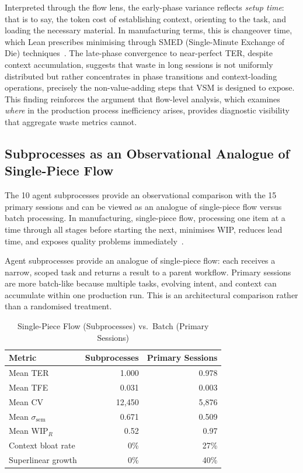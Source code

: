 \documentclass[journal]{IEEEtran}
\begin{document}
Interpreted through the flow lens, the early-phase variance reflects \emph{setup time}: that is to say, the token cost of establishing context, orienting to the task, and loading the necessary material. In manufacturing terms, this is changeover time, which Lean prescribes minimising through SMED (Single-Minute Exchange of Die) techniques~\cite{ohno1988}. The late-phase convergence to near-perfect TER, despite context accumulation, suggests that waste in long sessions is not uniformly distributed but rather concentrates in phase transitions and context-loading operations, precisely the non-value-adding steps that VSM is designed to expose. This finding reinforces the argument that flow-level analysis, which examines \emph{where} in the production process inefficiency arises, provides diagnostic visibility that aggregate waste metrics cannot.

\subsection{Subprocesses as an Observational Analogue of Single-Piece Flow}

The 10 agent subprocesses provide an observational comparison with the 15 primary sessions and can be viewed as an analogue of single-piece flow versus batch processing. In manufacturing, single-piece flow, processing one item at a time through all stages before starting the next, minimises WIP, reduces lead time, and exposes quality problems immediately~\cite{ohno1988}.

Agent subprocesses provide an analogue of single-piece flow: each receives a narrow, scoped task and returns a result to a parent workflow. Primary sessions are more batch-like because multiple tasks, evolving intent, and context can accumulate within one production run. This is an architectural comparison rather than a randomised treatment.

\begin{table}[t]
\centering
\caption{Single-Piece Flow (Subprocesses) vs.\ Batch (Primary Sessions)}
\label{tab:flow_comparison}
\begin{tabular}{@{}lrr@{}}
\toprule
\textbf{Metric} & \textbf{Subprocesses} & \textbf{Primary Sessions} \\
\midrule
Mean TER              & 1.000  & 0.978  \\
Mean TFE              & 0.031  & 0.003  \\
Mean CV               & 12,450 & 5,876  \\
Mean $\sigma_{\text{sem}}$ & 0.671 & 0.509 \\
Mean WIP$_R$          & 0.52   & 0.97   \\
Context bloat rate    & 0\%    & 27\%   \\
Superlinear growth    & 0\%    & 40\%   \\
\bottomrule
\end{tabular}
\end{table}
\end{document}
